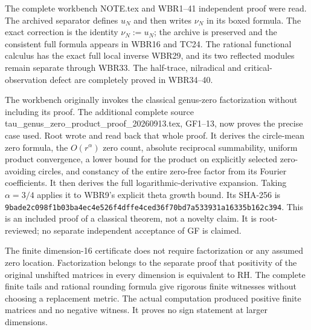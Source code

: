The complete workbench NOTE.tex and WBR1--41 independent proof were read. The archived separator defines \(u_N\) and then writes \(\nu_N\) in its boxed formula. The exact correction is the identity \(\nu_N:=u_N\); the archive is preserved and the consistent full formula appears in WBR16 and TC24. The rational functional calculus has the exact full local inverse WBR29, and its two reflected modules remain separate through WBR33. The half-trace, nilradical and critical-observation defect are completely proved in WBR34--40.

The workbench originally invokes the classical genus-zero factorization without including its proof. The additional complete source tau\_genus\_zero\_product\_proof\_20260913.tex, GF1--13, now proves the precise case used. Root wrote and read back that whole proof. It derives the circle-mean zero formula, the \(O(r^\alpha)\) zero count, absolute reciprocal summability, uniform product convergence, a lower bound for the product on explicitly selected zero-avoiding circles, and constancy of the entire zero-free factor from its Fourier coefficients. It then derives the full logarithmic-derivative expansion. Taking \(\alpha=3/4\) applies it to WBR9's explicit theta growth bound. Its SHA-256 is \nolinkurl{9bade2c098f1b03ba4ec4e526f4dffe4ced36f70bd7a533931a16335b162c394}. This is an included proof of a classical theorem, not a novelty claim. It is root-reviewed; no separate independent acceptance of GF is claimed.

The finite dimension-16 certificate does not require factorization or any assumed zero location. Factorization belongs to the separate proof that positivity of the original unshifted matrices in every dimension is equivalent to RH. The complete finite tails and rational rounding formula give rigorous finite witnesses without choosing a replacement metric. The actual computation produced positive finite matrices and no negative witness. It proves no sign statement at larger dimensions.
